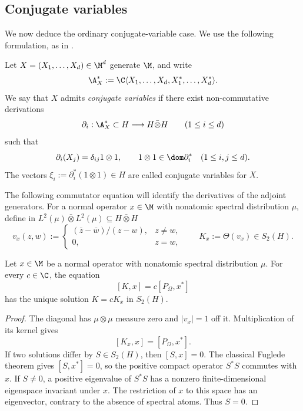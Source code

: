 \subsection{Conjugate variables}\label{subsec:ordinary-conjugates}

We now deduce the ordinary conjugate-variable case.
We use the following formulation, as in \cite[Proposition~3.5]{ACSY24}.

\begin{definition}\label{def:conjugate-variables}
Let $X=(X_1,\ldots,X_d)\in\M^d$ generate $\M$, and write
\[
 \A_X^\ast:=\C\langle X_1,\ldots,X_d,X_1^*,\ldots,X_d^*\rangle.
\]
We say that $X$ admits \emph{conjugate variables} if there exist non-commutative derivations
\[
 \partial_i:\A_X^\ast\subset H\longrightarrow H\bar\otimes H
 \qquad(1\leq i\leq d)
\]
such that
\begin{equation}
 \partial_i(X_j)=\delta_{ij}1\otimes1,\qquad
 1\otimes1\in\dom\partial_i^*
 \quad(1\leq i,j\leq d).
 \label{eq:normal-conjugate-condition}
\end{equation}
The vectors $\xi_i:=\partial_i^*(1\otimes1)\in H$ are called conjugate variables for $X$.
\end{definition}

The following commutator equation will identify the derivatives of the adjoint generators.
For a normal operator $x\in\M$ with nonatomic spectral distribution $\mu$, define in $L^2(\mu)\bar\otimes L^2(\mu)\subseteq H\bar\otimes H$
\begin{equation}\label{eq:normal-phase-kernel}
 v_x(z,w):=
 \begin{cases}
  (\bar z-\bar w)/(z-w),&z\ne w,\\
  0,&z=w,
 \end{cases}
 \qquad K_x:=\Theta(v_x)\in S_2(H).
\end{equation}

\begin{lemma}\label{lem:normal-adjoint-uniqueness}
Let $x\in\M$ be a normal operator with nonatomic spectral distribution $\mu$.
For every $c\in\C$, the equation
\[
 [K,x]=c[P_\Omega,x^*]
\]
has the unique solution $K=cK_x$ in $S_2(H)$.
\end{lemma}
\begin{proof}
The diagonal has $\mu\otimes\mu$ measure zero and $|v_x|=1$ off it.
Multiplication of its kernel gives
\[
 [K_x,x]=[P_\Omega,x^*].
\]
If two solutions differ by $S\in S_2(H)$, then $[S,x]=0$.
The classical Fuglede theorem \cite[Theorem~I, p.~35]{Fug50} gives $[S,x^*]=0$, so the positive compact operator $S^*S$ commutes with $x$.
If $S\ne0$, a positive eigenvalue of $S^*S$ has a nonzero finite-dimensional eigenspace invariant under $x$.
The restriction of $x$ to this space has an eigenvector, contrary to the absence of spectral atoms.
Thus $S=0$.
\end{proof}


